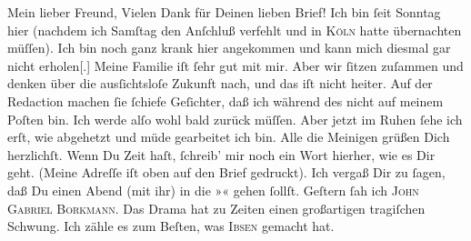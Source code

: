 \begin{ledgroupsized}[t]{13cm}
           \pstart{}Mein lieber Freund,\pend\pstart
           Vielen Dank für Deinen lieben Brief!\pend
           \pstart
           Ich bin ſeit Sonntag hier (nachdem ich Samſtag den Anſchluß verfehlt und in \textsc{Köln} hatte übernachten müſſen). Ich bin noch ganz krank hier angekommen und kann
               mich diesmal gar nicht erholen{[}.{]} Meine Familie iſt ſehr gut mit
               mir. Aber wir ſitzen zuſammen und denken über die ausſichtsloſe Zukunft nach, und das
               iſt nicht heiter. Auf der Redaction machen ſie ſchiefe Geſichter, daß ich während des \label{K_L02809-1v}\label{K_L02809-1h} nicht auf meinem Poſten bin. Ich werde alſo wohl bald zurück {\pb}müſſen. Aber jetzt im Ruhen ſehe ich erſt, wie
               abgehetzt und müde gearbeitet ich bin.\pend
           \pstart
           Alle die Meinigen grüßen Dich herzlichſt.\pend
           \pstart
           Wenn Du Zeit haſt, ſchreib’ mir noch ein Wort hierher, wie es Dir geht. (Meine
               Adreſſe iſt oben auf den Brief gedruckt).\pend
           \pstart
           Ich vergaß Dir zu ſagen, daß Du einen Abend (mit ihr) in die »\label{K_L02809-2v}\label{K_L02809-2h}« gehen ſollſt.\pend
           \pstart
           Geſtern ſah ich \textsc{John Gabriel Borkmann}.  Das Drama hat zu Zeiten einen
               großartigen tragiſchen Schwung. Ich zähle es zum Beſten, was \strikeout{\textcolor{gray}{×}\-\textcolor{gray}{×}\-\textcolor{gray}{×}}{ }\textsc{Ibsen} gemacht hat.\pend

\end{ledgroupsized}
